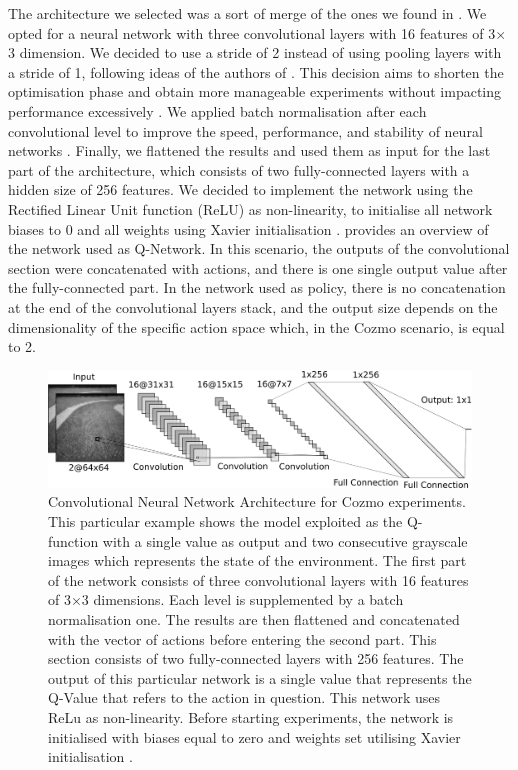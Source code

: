 The architecture we selected was a sort of merge of the ones we found in \cite{kendall2018learning,kendall2019learning,haarnoja2018alg}.
We opted for a neural network with three convolutional layers with 16 features of 3$\times$3 dimension.
We decided to use a stride of 2 instead of using pooling layers with a stride of 1, following ideas of the authors of \cite{kendall2018learning,kendall2019learning}.
This decision aims to shorten the optimisation phase and obtain more manageable experiments without impacting performance excessively \cite{springenberg2014striving}.
We applied batch normalisation after each convolutional level to improve the speed, performance, and stability of neural networks \cite{ioffe2015batch}.
Finally, we flattened the results and used them as input for the last part of the architecture, which consists of two fully-connected layers with a hidden size of 256 features.
We decided to implement the network using the Rectified Linear Unit function (ReLU) as non-linearity, to initialise all network biases to 0 and all weights using Xavier initialisation \cite{glorot2010understanding}.
 provides an overview of the network used as Q-Network.
In this scenario, the outputs of the convolutional section were concatenated with actions, and there is one single output value after the fully-connected part.
In the network used as policy, there is no concatenation at the end of the convolutional layers stack, and the output size depends on the dimensionality of the specific action space which, in the Cozmo scenario, is equal to 2.

\begin{figure}

    \centering
    \includegraphics[width=\textwidth]{img/cnn_cozmo.png}
    \caption[Convolutional Neural Network Architecture for Cozmo experiments]{ Convolutional Neural Network Architecture for Cozmo experiments.
        This particular example shows the model exploited as the Q-function with a single value as output and two consecutive grayscale images which represents the state of the environment.
        The first part of the network consists of three convolutional layers with 16 features of 3$\times$3 dimensions. Each level is supplemented by a batch normalisation one.
        The results are then flattened and concatenated with the vector of actions before entering the second part. This section consists of two fully-connected layers with 256 features.
        The output of this particular network is a single value that represents the Q-Value that refers to the action in question.
        This network uses ReLu as non-linearity. Before starting experiments, the network is initialised with biases equal to zero and weights set utilising Xavier initialisation \cite{glorot2010understanding}.}
    \label{fig:cnn_cozmo}
\end{figure}

